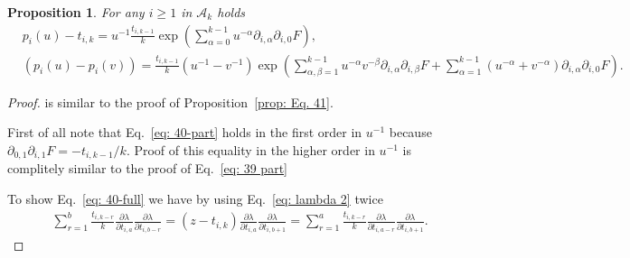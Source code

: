\documentclass[12pt,a4paper]{amsart}
\def\A{{\mathcal A}}
\newcommand{\p}{{\partial}}
\newcommand{\<}{\left<}
\renewcommand{\>}{\right>}
\newtheorem{proposition}[theorem]{Proposition}
\numberwithin{equation}{section}
\begin{document}
\begin{proposition}\label{prop: Eq. 40}
    For any $i \ge 1$ in $\A_k$ holds
    \begin{align}
        & p_i(u) - t_{i,k} = u^{-1} \frac{t_{i,k-1}}{k} \exp\left( \sum_{\alpha=0}^{k-1} u^{-\alpha} \p_{i,\alpha}\p_{i,0}F \right),
        \label{eq: 40-part}
        \\
        & (p_i(u) - p_i(v)) = \frac{t_{i,k-1}}{k} (u^{-1}-v^{-1}) \exp\left( \sum_{\alpha,\beta=1}^{k-1} u^{-\alpha} v^{-\beta} \p_{i,\alpha}\p_{i,\beta} F + \sum_{\alpha=1}^{k-1} (u^{-\alpha} + v^{-\alpha} ) \p_{i,\alpha}\p_{i,0} F  \right).
        \label{eq: 40-full}
    \end{align}

\end{proposition}
\begin{proof}
is similar to the proof of Proposition~\ref{prop: Eq. 41}.

First of all note that Eq.~\eqref{eq: 40-part} holds in the first order in $u^{-1}$ because $\p_{0,1}\p_{i,1}F = - t_{i,k-1}/k$. Proof of this equality in the higher order in $u^{-1}$ is complitely similar to the proof of Eq.~\eqref{eq: 39 part}

To show Eq.~\eqref{eq: 40-full} we have by using Eq.~\eqref{eq: lambda 2} twice
\begin{align}
    & \sum_{r=1}^b \frac{t_{i,k-r}}{k} \frac{\p \lambda}{\p t_{i,a}} \frac{\p \lambda}{\p t_{i,b-r}} 
    = (z - t_{i,k}) \frac{\p \lambda}{\p t_{i,a}}\frac{\p \lambda}{\p t_{i,b+1}} 
    = \sum_{r=1}^a \frac{t_{i,k-r}}{k} \frac{\p \lambda}{\p t_{i,a-r}}\frac{\p \lambda}{\p t_{i,b+1}}.
\end{align}
\end{proof}
\end{document}

